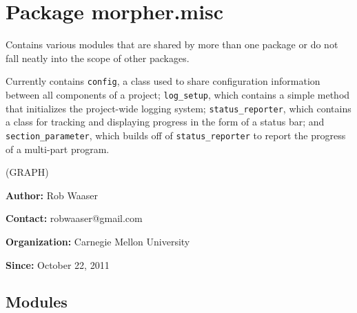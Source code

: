 %
%
%


\section{Package morpher.misc}

    \label{morpher:misc}
Contains various modules that are shared by more than one package or do not
fall neatly into the scope of other packages.

Currently contains \texttt{config}, a class used to share configuration 
information between all components of a project; \texttt{log\_setup}, which
contains a simple method that initializes the project-wide logging system; 
\texttt{status\_reporter}, which contains a class for tracking and 
displaying progress in the form of a status bar; and 
\texttt{section\_parameter}, which builds off of \texttt{status\_reporter} 
to report the progress of a multi-part program.



(GRAPH)

\textbf{Author:} Rob Waaser



\textbf{Contact:} robwaaser@gmail.com



\textbf{Organization:} Carnegie Mellon University



\textbf{Since:} October 22, 2011





\subsection{Modules}


